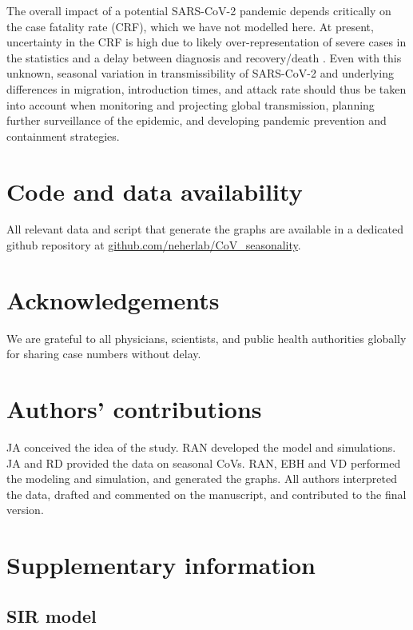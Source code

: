 \documentclass[rmp, reprint, superscriptaddress, floatfix,amsmath]{revtex4-1}
\begin{document}
The overall impact of a potential SARS-CoV-2 pandemic depends critically on the case fatality rate (CRF), which we have not modelled here. 
At present, uncertainty in the CRF is high due to likely over-representation of severe cases in the statistics and a delay between diagnosis and recovery/death  \citep{battegay_2019-novel_2020}. 
Even with this unknown, seasonal variation in transmissibility of SARS-CoV-2 and underlying differences in migration, introduction times, and attack rate should thus be taken into account when monitoring and projecting global transmission, planning further surveillance of the epidemic, and developing pandemic prevention and containment strategies.


\section{Code and data availability}
All relevant data and script that generate the graphs are available in a dedicated github repository at \url{github.com/neherlab/CoV_seasonality}.

\section*{Acknowledgements}
We are grateful to all physicians, scientists, and public health authorities globally for sharing case numbers without delay.

\section*{Authors' contributions}
JA conceived the idea of the study. RAN developed the model and simulations. JA and RD provided the data on seasonal CoVs. RAN, EBH and VD performed the modeling and simulation, and generated the graphs. All authors interpreted the data, drafted and commented on the manuscript, and contributed to the final version. 



\newpage

\appendix
\setcounter{figure}{0}
\renewcommand{\figurename}{Figure S}
\setcounter{table}{0}
\renewcommand{\tablename}{Table S}

\section*{Supplementary information}

\subsection{SIR model}
\end{document}
